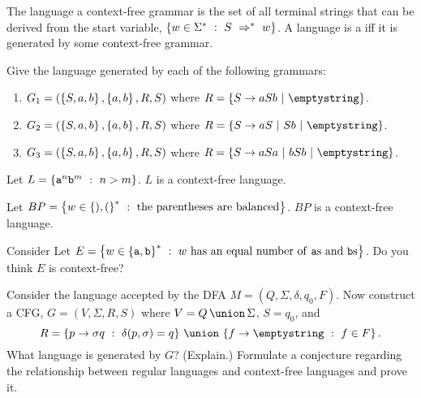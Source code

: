 \documentclass[twoside,letterpaper,openany]{book}
\begin{document}
\begin{defn}
The language  a context-free grammar is the set of all terminal strings that can be derived from the start variable,  $\left\lbrace w \in \Sigma^{*}\ :\ S \ \Rightarrow^*\  w \right\rbrace$. A language is a  iff it is generated by some context-free grammar.
\end{defn}

\begin{exer1}\label{exer:cfglangs}
Give the language generated by each of the following grammars:
\begin{enumerate}
\item $G_1 = (\left\lbrace S, a, b \right\rbrace, \left\lbrace a, b \right\rbrace, R, S)$ where $R = \setdef{S \to aSb~|~\emptystring}$.
\item $G_2 = (\left\lbrace S, a, b \right\rbrace, \left\lbrace a, b \right\rbrace, R, S)$ where $R = \setdef{S \to aS ~|~ Sb ~|~\emptystring}$.
\item $G_3 = (\left\lbrace S, a, b \right\rbrace, \left\lbrace a, b \right\rbrace, R, S)$ where $R = \setdef{S \to aSa ~|~ bSb ~|~\emptystring}$.
\end{enumerate}
\end{exer1}

\begin{stmt2}
Let $L = \left\lbrace {\texttt{a}}^n {\texttt{b}}^m\ :\ n > m \right\rbrace$. $L$ is a context-free language.
\end{stmt2}

\begin{stmt2}
Let $BP = \left\lbrace w \in \left\lbrace ), ( \right\rbrace^{*}\ :\ \textrm{the parentheses are balanced} \right\rbrace$. $BP$ is a context-free language.
\end{stmt2}

\begin{exer2}
Consider Let $E = \left\lbrace w \in \left\lbrace {\texttt{a}}, {\texttt{b}} \right\rbrace^{*}\ :\ w~\textrm{has an equal number of {\texttt{a}}{s} and {\texttt{b}}{s}} \right\rbrace$. Do you think $E$ is context-free?
\end{exer2}

\begin{stmt3}
Consider the language accepted by the DFA $M = (Q, \Sigma, \delta, q_0, F)$. Now construct a CFG, $G = (V, \Sigma, R, S)$ where $V = \setunion{Q}{\Sigma}$, $S = q_0$, and 
\[ R = \setunion{\setbuild{p \to \sigma q}{\delta(p, \sigma) = q}}{\setbuild{f \to \emptystring}{f \in F}}. \]
What language is generated by $G$? (Explain.) Formulate a conjecture regarding the relationship between regular languages and context-free languages and prove it.
\end{stmt3}
\end{document}
